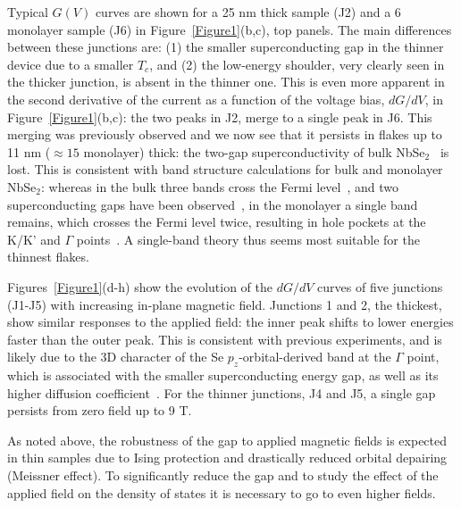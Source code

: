 \documentclass[showpacs,superscriptaddress,preprint,prb]{revtex4}
\begin{document}
Typical $G(V)$ curves are shown for a 25 nm thick sample (J2) and a 6 monolayer sample (J6) in Figure~\ref{Figure1}(b,c), top panels. The main differences between these junctions are: (1) the smaller superconducting gap in the thinner device due to a smaller $T_c$, and (2) the low-energy shoulder, very clearly seen in the thicker junction, is absent in the thinner one. This is even more apparent in the second derivative of the current as a function of the voltage bias, $dG/dV$, in Figure~\ref{Figure1}(b,c): the two peaks in J2, merge to a single peak in J6. This merging was previously observed \cite{dvir, khestanova2018} and we now see that it persists in flakes up to 11 nm ($\approx 15$ monolayer) thick: the two-gap superconductivity of bulk NbSe$_2$~\cite{noat2015} is lost. This is consistent with band structure calculations for bulk and monolayer NbSe$_2$: whereas in the bulk three bands cross the Fermi level~\cite{johannes,yokoya}, and two superconducting gaps have been observed~\cite{dvir}, in the monolayer a single band remains, which crosses the Fermi level twice, resulting in hole pockets at the K/K' and $\Gamma$ points~\cite{wickramaratne2020}. A single-band theory thus seems most suitable for the thinnest flakes. 

Figures~\ref{Figure1}(d-h) show the evolution of the $dG/dV$ curves of five junctions (J1-J5) with increasing in-plane magnetic field. Junctions 1 and 2, the thickest, show similar responses to the applied field: the inner peak shifts to lower energies faster than the outer peak. This is consistent with previous experiments, and is likely due to the 3D character of the Se $p_z$-orbital-derived band at the $\Gamma$ point, which is associated with the smaller superconducting energy gap, as well as its higher diffusion coefficient~\cite{dvir,dvir_nanoletters}. For the thinner junctions, J4 and J5, a single gap persists from zero field up to 9 T.

As noted above, the robustness of the gap to applied magnetic fields is expected in thin samples due to Ising protection and drastically reduced orbital depairing (Meissner effect). To significantly reduce the gap and to study the effect of the applied field on the density of states it is necessary to go to even higher fields. 
\end{document}
